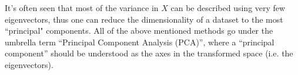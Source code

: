 It's often seen that most of the variance in $X$ can be described using very few eigenvectors, thus one can reduce the dimensionality of a dataset to the most ``principal" components.
All of the above mentioned methods go under the umbrella term ``Principal Component Analysis (PCA)'', where a ``principal component'' should be understood as the axes in the transformed space (i.e. the eigenvectors).
